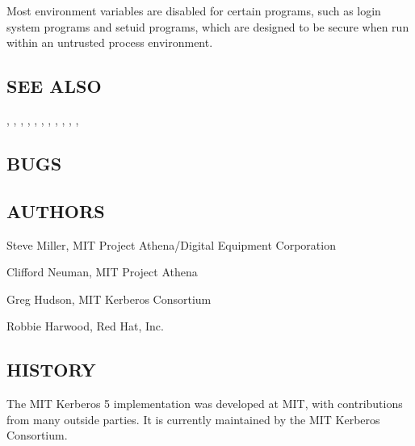 \documentclass[letterpaper,10pt,english]{sphinxmanual}
\begin{document}
\sphinxAtStartPar
Most environment variables are disabled for certain programs, such as
login system programs and setuid programs, which are designed to be
secure when run within an untrusted process environment.


\subsection{SEE ALSO}
\label{\detokenize{user/user_config/kerberos:see-also}}
\sphinxAtStartPar
{\hyperref[\detokenize{user/user_commands/kdestroy:kdestroy-1}]{}}, {\hyperref[\detokenize{user/user_commands/kinit:kinit-1}]{}}, {\hyperref[\detokenize{user/user_commands/klist:klist-1}]{}},
{\hyperref[\detokenize{user/user_commands/kswitch:kswitch-1}]{}}, {\hyperref[\detokenize{user/user_commands/kpasswd:kpasswd-1}]{}}, {\hyperref[\detokenize{user/user_commands/ksu:ksu-1}]{}},
, , ,
, , 


\subsection{BUGS}
\label{\detokenize{user/user_config/kerberos:bugs}}

\subsection{AUTHORS}
\label{\detokenize{user/user_config/kerberos:authors}}
\begin{DUlineblock}{0em}
\item[] Steve Miller, MIT Project Athena/Digital Equipment Corporation
\item[] Clifford Neuman, MIT Project Athena
\item[] Greg Hudson, MIT Kerberos Consortium
\item[] Robbie Harwood, Red Hat, Inc.
\end{DUlineblock}


\subsection{HISTORY}
\label{\detokenize{user/user_config/kerberos:history}}
\sphinxAtStartPar
The MIT Kerberos 5 implementation was developed at MIT, with
contributions from many outside parties.  It is currently maintained
by the MIT Kerberos Consortium.
\end{document}

